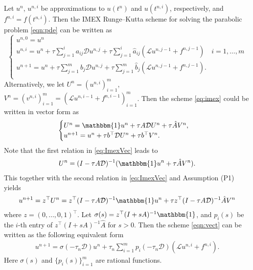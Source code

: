 \documentclass[a4paper, oneside]{book}
\def\bbone{{\mathbbm{1}}}
\def\hata{{\hat{a}}}
\def\hatA{{\hat{A}}}
\def\hatb{{\hat{b}}}
\def\calD{{\mathcal{D}}}
\def\calL{{\mathcal{L}}}
\begin{document}
Let $u^n$, $u^{n,i}$ be approximations to $u(t^n)$ and $u(t^{n,i})$, respectively, and $f^{n,i} = f(t^{n,i})$. Then the IMEX Runge--Kutta scheme for solving the parabolic problem \eqref{eqn:pde} can be written as
\begin{equation} \label{eq:imex}
    \begin{cases}
        u^{n,0} = u^{n}\\
        u^{n,i} = u^{n} + \tau \sum\limits_{j=1}^ia_{ij} \calD u^{n,j} + \tau \sum\limits_{j=1}^i\hata_{ij}(\calL u^{n,j-1}+f^{n, j-1}) \quad i = 1, \dots, m\\
        u^{n+1} = u^{n} + \tau \sum\limits_{j=1}^m b_j \calD u^{n,j} + \tau \sum\limits_{j=1}^m \hatb_j(\calL u^{n,j-1}+f^{n, j-1}). \\
    \end{cases}
\end{equation}
Alternatively, we let $U^n = (u^{n,i})_{i=1}^m$,
$V^n =  (v^{n,i})_{i=1}^m =  (\calL u^{n,i-1}+f^{n,i-1})_{i=1}^m$.
Then the scheme \eqref{eq:imex} could be written in vector form as
\begin{equation} \label{eq:ImexVec}
    \begin{cases}
        U^n = \bbone u^{n} + \tau A \calD U^n + \tau \hatA V^n,\\
        u^{n+1} = u^{n} + \tau b^\top \calD U^n + \tau b^\top V^n.
    \end{cases}
\end{equation}
Note that the first relation in \eqref{eq:ImexVec} leads to
$$U^n = (I - \tau A\calD)^{-1} (\bbone u^{n} + \tau \hatA V^n).$$
This together with the second relation in \eqref{eq:ImexVec} and Assumption (P1) yields
\begin{equation}\label{eqn:vect}
\begin{aligned}
 u^{n+1} = z^\top U^n = z^\top(I - \tau A\calD)^{-1}\bbone u^{n} + \tau z^\top(I - \tau A\calD)^{-1}\hatA V^n
\end{aligned}
\end{equation}
where $z = (0, \dots, 0, 1)^\top$.
Let $\sigma(s) = z^\top(I + sA)^{-1}\bbone$,
and $p_i(s)$ be the $i$-th entry of $z^\top(I + sA)^{-1}\hatA$
for $s > 0$.
Then the scheme \eqref{eqn:vect} can  be written as the following equivalent form 
\begin{align}\label{eqn:SingleStep}
    u^{n+1} = \sigma(-\tau_n \calD)u^{n} + \tau_n \sum_{i=1}^mp_i(-\tau_n \calD)(\calL  u^{n,i} + f^{n,i}).
\end{align}
Here $\sigma(s)$ and $\{p_i(s)\}_{i=1}^m$ are rational functions.
\end{document}
